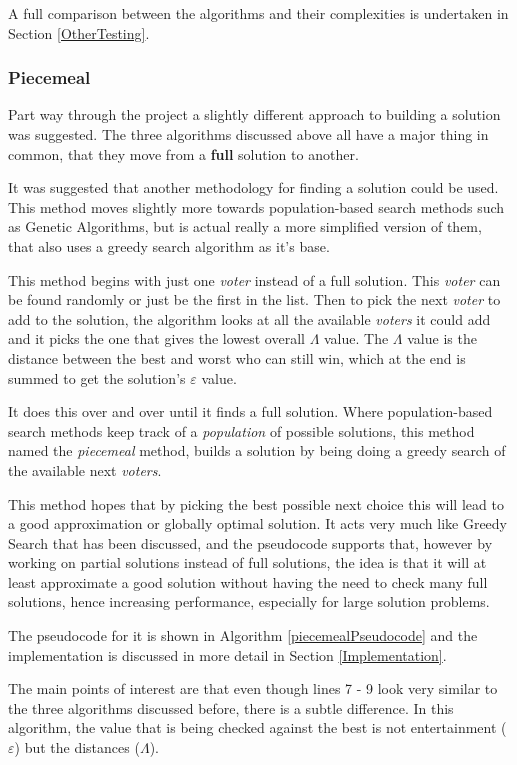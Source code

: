 \documentclass[12pt]{report}
\begin{document}
A full comparison between the algorithms and their complexities is undertaken in Section \ref{OtherTesting}.


\subsubsection{Piecemeal}
Part way through the project a slightly different approach to building a solution was suggested. The three algorithms discussed above all have a major thing in common, that they move from a \textbf{full} solution to another.

It was suggested that another methodology for finding a solution could be used. This method moves slightly more towards population-based search methods such as Genetic Algorithms, but is actual really a more simplified version of them, that also uses a greedy search algorithm as it's base. 

This method begins with just one \textit{voter} instead of a full solution. This \textit{voter} can be found randomly or just be the first in the list. Then to pick the next \textit{voter} to add to the solution, the algorithm looks at all the available \textit{voters} it could add and it picks the one that gives the lowest overall $\Lambda$ value. The $\Lambda$ value is the distance between the best and worst who can still win, which at the end is summed to get the solution's $\varepsilon$ value.

It does this over and over until it finds a full solution. Where population-based search methods keep track of a \textit{population} of possible solutions, this method named the \textit{piecemeal} method, builds a solution by being doing a greedy search of the available next \textit{voters}.

This method hopes that by picking the best possible next choice this will lead to a good approximation or globally optimal solution. It acts very much like Greedy Search that has been discussed, and the pseudocode supports that, however by working on partial solutions instead of full solutions, the idea is that it will at least approximate a good solution without having the need to check many full solutions, hence increasing performance, especially for large solution problems.

The pseudocode for it is shown in Algorithm \ref{piecemealPseudocode} and the implementation is discussed in more detail in Section \ref{Implementation}.

The main points of interest are that even though lines 7 - 9 look very similar to the three algorithms discussed before, there is a subtle difference. In this algorithm, the value that is being checked against the best is not entertainment ($\varepsilon$) but the distances ($\Lambda$).
\end{document}
